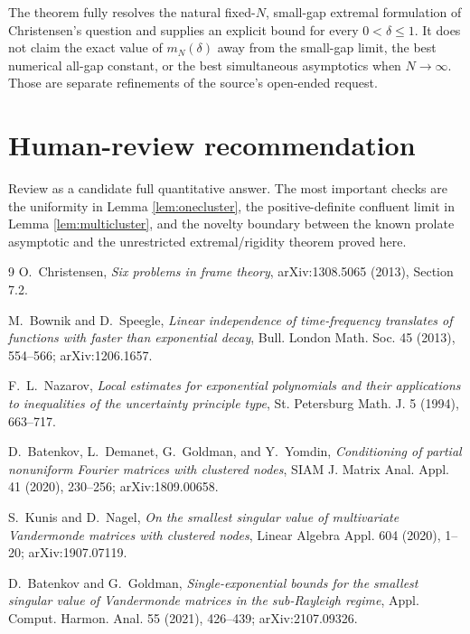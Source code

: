 \documentclass[11pt]{article}
\begin{document}
The theorem fully resolves the natural fixed-$N$, small-gap extremal formulation of Christensen's question and supplies an explicit bound for every $0<\delta\leq1$.  It does not claim the exact value of $m_N(\delta)$ away from the small-gap limit, the best numerical all-gap constant, or the best simultaneous asymptotics when $N\to\infty$.  Those are separate refinements of the source's open-ended request.

\section{Human-review recommendation}

Review as a candidate full quantitative answer.  The most important checks are the uniformity in Lemma \ref{lem:onecluster}, the positive-definite confluent limit in Lemma \ref{lem:multicluster}, and the novelty boundary between the known prolate asymptotic and the unrestricted extremal/rigidity theorem proved here.

\begin{thebibliography}{9}
O.~Christensen,
\emph{Six problems in frame theory},
arXiv:1308.5065 (2013), Section 7.2.

M.~Bownik and D.~Speegle,
\emph{Linear independence of time-frequency translates of functions with faster than exponential decay},
Bull. London Math. Soc. 45 (2013), 554--566; arXiv:1206.1657.

F.~L.~Nazarov,
\emph{Local estimates for exponential polynomials and their applications to inequalities of the uncertainty principle type},
St. Petersburg Math. J. 5 (1994), 663--717.

D.~Batenkov, L.~Demanet, G.~Goldman, and Y.~Yomdin,
\emph{Conditioning of partial nonuniform Fourier matrices with clustered nodes},
SIAM J. Matrix Anal. Appl. 41 (2020), 230--256; arXiv:1809.00658.

S.~Kunis and D.~Nagel,
\emph{On the smallest singular value of multivariate Vandermonde matrices with clustered nodes},
Linear Algebra Appl. 604 (2020), 1--20; arXiv:1907.07119.

D.~Batenkov and G.~Goldman,
\emph{Single-exponential bounds for the smallest singular value of Vandermonde matrices in the sub-Rayleigh regime},
Appl. Comput. Harmon. Anal. 55 (2021), 426--439; arXiv:2107.09326.
\end{thebibliography}
\end{document}
